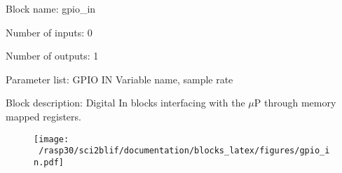 \pagebreak

Block name: gpio\_in

Number of inputs: 0

Number of outputs: 1

Parameter list: GPIO IN Variable name, sample rate

Block description: 
Digital In blocks interfacing with the $\mu$P through memory mapped registers.

\begin{figure}[H]  %
\texttt{[image: ~/rasp30/sci2blif/documentation/blocks\_latex/figures/gpio\_in.pdf]}
\end{figure}

